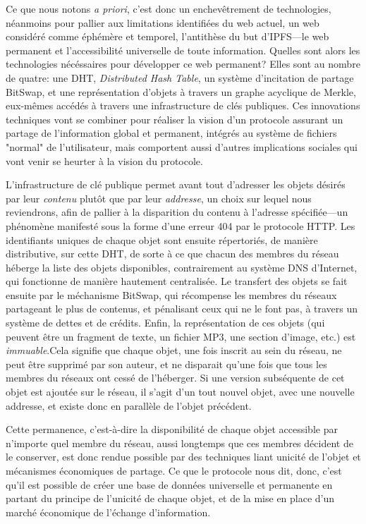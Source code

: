 \documentclass{article}
\begin{document}
Ce que nous notons \emph{a priori}, c'est donc un enchevêtrement de technologies, néanmoins pour pallier aux limitations identifiées du web actuel, un web considéré comme éphémère et temporel, l'antithèse du but d'IPFS—le web permanent et l'accessibilité universelle de toute information. Quelles sont alors les technologies nécéssaires pour développer ce web permanent? Elles sont au nombre de quatre: une DHT, \emph{Distributed Hash Table}, un système d'incitation de partage BitSwap, et une représentation d'objets à travers un graphe acyclique de Merkle, eux-mêmes accédés à travers une infrastructure de clés publiques. Ces innovations techniques vont se combiner pour réaliser la vision d'un protocole assurant un partage de l'information global et permanent, intégrés au système de fichiers "normal" de l'utilisateur, mais comportent aussi d'autres implications sociales qui vont venir se heurter à la vision du protocole.

L'infrastructure de clé publique permet avant tout d'adresser les objets désirés par leur \emph{contenu} plutôt que par leur \emph{addresse}, un choix sur lequel nous reviendrons, afin de pallier à la disparition du contenu à l'adresse spécifiée—un phénomène manifesté sous la forme d'une erreur 404 par le protocole HTTP. Les identifiants uniques de chaque objet sont ensuite répertoriés, de manière distributive, sur cette DHT, de sorte à ce que chacun des membres du réseau héberge la liste des objets disponibles, contrairement au système DNS d'Internet, qui fonctionne de manière hautement centralisée. Le transfert des objets se fait ensuite par le méchanisme BitSwap, qui récompense les membres du réseaux partageant le plus de contenus, et pénalisant ceux qui ne le font pas, à travers un système de dettes et de crédits. Enfin, la représentation de ces objets (qui peuvent être un fragment de texte, un fichier MP3, une section d'image, etc.) est \emph{immuable}.Cela signifie que chaque objet, une fois inscrit au sein du réseau, ne peut être supprimé par son auteur, et ne disparait qu'une fois que tous les membres du réseaux ont cessé de l'héberger. Si une version subséquente de cet objet est ajoutée sur le réseau, il s'agit d'un tout nouvel objet, avec une nouvelle addresse, et existe donc en parallèle de l'objet précédent.

Cette permanence, c'est-à-dire la disponibilité de chaque objet accessible par n'importe quel membre du réseau, aussi longtemps que ces membres décident de le conserver, est donc rendue possible par des techniques liant unicité de l'objet et mécanismes économiques de partage. Ce que le protocole nous dit, donc, c'est qu'il est possible de créer une base de données universelle et permanente en partant du principe de l'unicité de chaque objet, et de la mise en place d'un marché économique de l'échange d'information.
\end{document}

